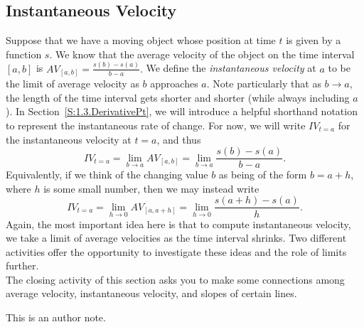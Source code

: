 \subsection*{Instantaneous Velocity}

Suppose that we have a moving object whose position at time $t$ is given by a function $s$.  We know that the average velocity of the object on the time interval $[a,b]$ is $AV_{[a,b]} = \frac{s(b)-s(a)}{b-a}.$  We define the \emph{instantaneous velocity}  at $a$ to be the limit of average velocity as $b$ approaches $a$.  Note particularly that as $b \to a$, the length of the time interval gets shorter and shorter (while always including $a$).  In Section~\ref{S:1.3.DerivativePt}, we will introduce a helpful shorthand notation to represent the instantaneous rate of change.  For now, we will write $IV_{t=a}$ for the instantaneous velocity at $t = a$, and thus
$$IV_{t=a} = \lim_{b \to a} AV_{[a,b]} = \lim_{b \to a} \frac{s(b)-s(a)}{b-a}.$$
Equivalently, if we think of the changing value $b$ as being of the form $b = a + h$, where $h$ is some small number, then we may instead write
$$IV_{t=a} = \lim_{h \to 0} AV_{[a,a+h]} = \lim_{h \to 0} \frac{s(a+h)-s(a)}{h}.$$
Again, the most important idea here is that to compute instantaneous velocity, we take a limit of average velocities as the time interval shrinks.  Two different activities offer the opportunity to investigate these ideas and the role of limits further. \\



\nin The closing activity of this section asks you to make some connections among average velocity, instantaneous velocity, and slopes of certain lines.



\begin{authornote}
This is an author note.
\end{authornote}


